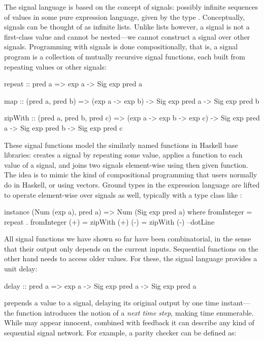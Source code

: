 \documentclass[../paper.tex]{subfiles}
\begin{document}
The signal language is based on the concept of signals: possibly infinite sequences of values in some pure expression language, given by the type . Conceptually, signals can be thought of as infinite lists. Unlike lists however, a signal is not a first-class value and cannot be nested---we cannot construct a signal over other signals. Programming with signals is done compositionally, that is, a signal program is a collection of mutually recursive signal functions, each built from repeating values or other signals:

\begin{code}
repeat :: pred a => exp a -> Sig exp pred a

map :: (pred a, pred b)
  => (exp a -> exp b)
  -> Sig exp pred a -> Sig exp pred b

zipWith :: (pred a, pred b, pred c)
  => (exp a -> exp b -> exp c)
  -> Sig exp pred a -> Sig exp pred b -> Sig exp pred c
\end{code}

These signal functions model the similarly named functions in Haskell base libraries:  creates a signal by repeating some value,  applies a function to each value of a signal, and  joins two signals element-wise using then given function. The idea is to mimic the kind of compositional programming that users normally do in Haskell, or using vectors. Ground types in the expression language are lifted to operate element-wise over signals as well, typically with a type class like :

\begin{code}
instance (Num (exp a), pred a) => Num (Sig exp pred a) where
  fromInteger = repeat . fromInteger
  (+)         = zipWith (+)
  (-)         = zipWith (-)
  --dotLine
\end{code}

All signal functions we have shown so far have been combinatorial, in the sense that their output only depends on the current inputs. Sequential functions on the other hand needs to access older values. For these, the signal language provides a unit delay:

\begin{code}
delay :: pred a => exp a -> Sig exp pred a -> Sig exp pred a
\end{code}

\noindent {} prepends a value to a signal, delaying its original output by one time instant---the function introduces the notion of a \emph{next time step}, making time enumerable. While  may appear innocent, combined with feedback it can describe any kind of sequential signal network. For example, a parity checker can be defined as:
\end{document}
